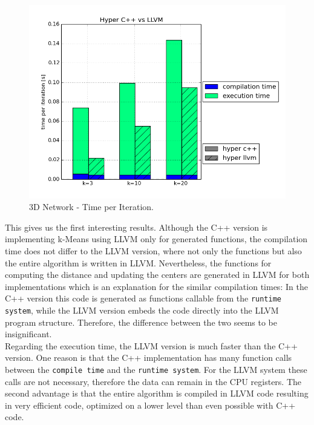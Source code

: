 \begin{figure}[htsb]
  \centering
  \includegraphics[scale=0.4, trim="0cm 1.5cm 0cm 0cm"]{figures/charts/hyper_network}
  \caption[3D Network - Time per Iteration]{3D Network - Time per Iteration.}
  \label{fig:hyper_network}
\end{figure}

This gives us the first interesting results. Although the C++ version is implementing k-Means using LLVM only for generated functions, the compilation time does not differ to the LLVM version, where not only the functions but also the entire algorithm is written in LLVM. Nevertheless, the functions for computing the distance and updating the centers are generated in LLVM for both implementations which is an explanation for the similar compilation times: In the C++ version this code is generated as functions callable from the \texttt{runtime system}, while the LLVM version embeds the code directly into the LLVM program structure. Therefore, the difference between the two seems to be insignificant.
\\
Regarding the execution time, the LLVM version is much faster than the C++ version. One reason is that the C++ implementation has many function calls between the \texttt{compile time} and the \texttt{runtime system}. For the LLVM system these calls are not necessary, therefore the data can remain in the CPU registers. The second advantage is that the entire algorithm is compiled in LLVM code resulting in very efficient code, optimized on a lower level than even possible with C++ code.


